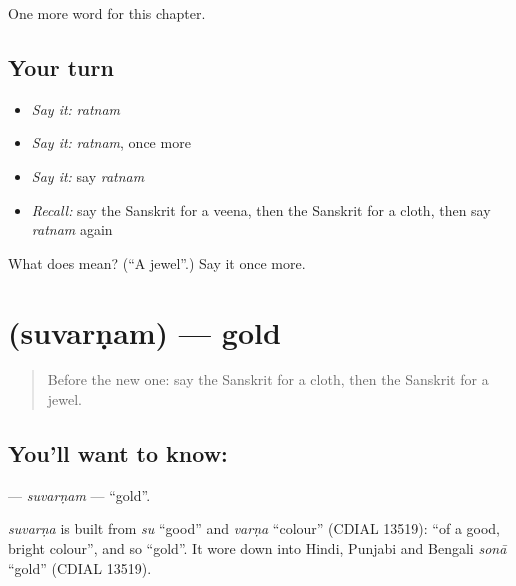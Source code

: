 \begin{grammarlens}[title={What you've built}]
One more word for this chapter.
\end{grammarlens}

\subsection*{Your turn}
\begin{itemize}
\raggedright
  \item \emph{Say it:} \emph{ratnam}
  \item \emph{Say it:} \emph{ratnam}, once more
  \item \emph{Say it:} say \emph{ratnam}
  \item \emph{Recall:} say the Sanskrit for a veena, then the Sanskrit for a cloth, then say \emph{ratnam} again
\end{itemize}

\begin{tcolorbox}[breakable,colback=teal!4,colframe=teal!35!black,title={Before you move on}]
What does  mean? (\textquotedblleft{}A jewel\textquotedblright{}.) Say it once more.
\end{tcolorbox}
\section[\texorpdfstring{\sk{सुवर्णम्} (suvarṇam)}{सुवर्णम् (suvarṇam)}]{ (suvarṇam) — gold}

\label{lesson:SA-C121-suvarnam}



\begin{quote}
Before the new one: say the Sanskrit for a cloth, then the Sanskrit for a jewel.
\end{quote}

\subsection*{You'll want to know: }
\textbf{} — \emph{suvarṇam} — \textquotedblleft{}gold\textquotedblright{}.

\begin{cousinweb}
\emph{suvarṇa} is built from \emph{su} \textquotedblleft{}good\textquotedblright{} and \emph{varṇa} \textquotedblleft{}colour\textquotedblright{} (CDIAL 13519): \textquotedblleft{}of a good, bright colour\textquotedblright{}, and so \textquotedblleft{}gold\textquotedblright{}. It wore down into Hindi, Punjabi and Bengali \emph{sonā} \textquotedblleft{}gold\textquotedblright{} (CDIAL 13519).
\end{cousinweb}

